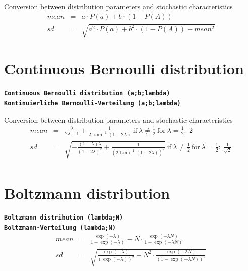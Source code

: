 \documentclass{svmono}
\def\cm#1{\textbf{\texttt{#1}}}
\begin{document}
Conversion between distribution parameters and stochastic characteristics
\begin{eqnarray*}
mean&=&a\cdot P(a)+b\cdot(1-P(A))\\
sd&=&\sqrt{a^2\cdot P(a)+b^2\cdot(1-P(A))-mean^2}
\end{eqnarray*}





\section*{Continuous Bernoulli distribution}
\cm{Continuous Bernoulli distribution (a;b;lambda)}~\\
\cm{Kontinuierliche Bernoulli-Verteilung (a;b;lambda)}

Conversion between distribution parameters and stochastic characteristics
\begin{eqnarray*}
mean&=&\frac{\lambda}{2\lambda-1}+\frac{1}{2\tanh^{-1}(1-2\lambda)} ~\text{if}~ \lambda\neq\frac{1}{2} ~\text{for}~ \lambda=\frac{1}{2}:~ 2\\
sd&=&\sqrt{-\frac{(1-\lambda)\lambda}{(1-2\lambda)^2}+\frac{1}{(2\tanh^{-1}(1-2\lambda))^2}} ~\text{if}~ \lambda\neq\frac{1}{2} ~\text{for}~ \lambda=\frac{1}{2}:~ \frac{1}{\sqrt{2}}\\
\end{eqnarray*}





\section*{Boltzmann distribution}
\cm{Boltzmann distribution (lambda;N)}~\\
\cm{Boltzmann-Verteilung (lambda;N)}
\begin{eqnarray*}
mean&=&\frac{\exp(-\lambda)}{1-\exp(-\lambda)}-N\cdot\frac{\exp(-\lambda N)}{1-\exp(-\lambda N)}\\
sd&=&\sqrt{\frac{\exp(-\lambda)}{(\exp(-\lambda))^2}-N^2\cdot\frac{\exp(-\lambda N)}{(1-\exp(-\lambda N))^2}}
\end{eqnarray*}
\end{document}
